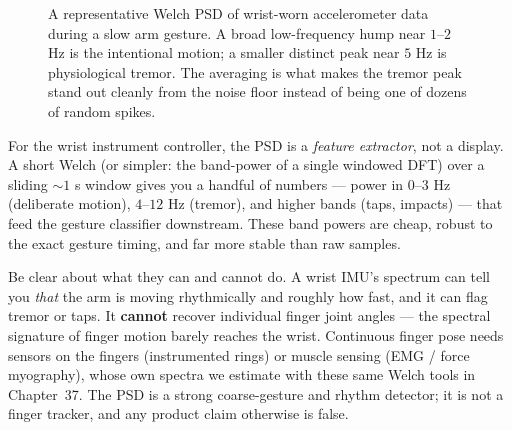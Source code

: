 \begin{figure}[H]
\centering
{}
\caption{A representative Welch PSD of wrist-worn accelerometer data during a slow
arm gesture. A broad low-frequency hump near $1$--$2$ Hz is the intentional motion;
a smaller distinct peak near $5$ Hz is physiological tremor. The averaging is what
makes the tremor peak stand out cleanly from the noise floor instead of being one
of dozens of random spikes.}
\label{ch21:fig-imu-psd}
\end{figure}

\begin{goalbox}
For the wrist instrument controller, the PSD is a \emph{feature extractor}, not a
display. A short Welch (or simpler: the band-power of a single windowed DFT) over a
sliding $\sim 1$ s window gives you a handful of numbers --- power in $0$--$3$ Hz
(deliberate motion), $4$--$12$ Hz (tremor), and higher bands (taps, impacts) ---
that feed the gesture classifier downstream. These band powers are cheap, robust to
the exact gesture timing, and far more stable than raw samples.

Be clear about what they can and cannot do. A wrist IMU's spectrum can tell you
\emph{that} the arm is moving rhythmically and roughly how fast, and it can flag
tremor or taps. It \textbf{cannot} recover individual finger joint angles --- the
spectral signature of finger motion barely reaches the wrist. Continuous finger
pose needs sensors on the fingers (instrumented rings) or muscle sensing (EMG /
force myography), whose own spectra we estimate with these same Welch tools
in Chapter~37. The PSD is a strong coarse-gesture and rhythm
detector; it is not a finger tracker, and any product claim otherwise is false.
\end{goalbox}

